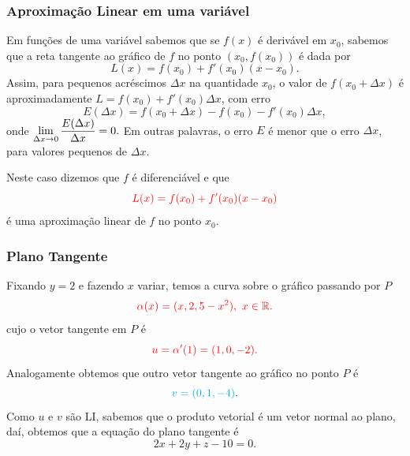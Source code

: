 \begin{frame}[label=der-parciais]
	\frametitle{Aproximação Linear em uma variável}
Em funções de uma variável sabemos que se {\color{blue}$f(x)$ é derivável em $x_0$}, sabemos que a reta tangente ao gráfico de $f$ no ponto $(x_0,f(x_0))$ é dada por
			\[L(x)=f(x_0)+f'(x_0)(x-x_0).\]
			Assim, para pequenos acréscimos $\Delta x$ na quantidade $x_0$, o valor de $f(x_0+\Delta x)$ é aproximadamente $L=f(x_0)+f'(x_0)\Delta x$, com erro
			\[E(\Delta x)=f(x_0+\Delta x)-f(x_0)-f'(x_0)\Delta x,\]
			onde {\color{red}$\displaystyle\lim_{\Delta x\to 0}\frac{E(\Delta x)}{\Delta x}=0.$} Em outras palavras, o erro $E$ é menor que o erro $\Delta x$, para valores pequenos de $\Delta x$.
			
			
			Neste caso dizemos que $f$ é {\color{blue} diferenciável} e  que 
\[{\color{red}L(x)=f(x_0)+f'(x_0)(x-x_0)}\]
é uma {\color{red} aproximação linear} de $f$ no ponto $x_0$.
		
		
\end{frame}


\begin{frame}[label=der-parciais]
	\frametitle{Plano Tangente }
		
		\bigskip 
		
Fixando  $y=2$ e fazendo $x$ variar, temos a curva sobre o gráfico passando por $P$
\[{\color{red}\alpha(x)=(x,2,5-x^2),\ x\in \mathbb{R}.}\]
cujo  o vetor tangente em $P$ é
\[{\color{red}u=\alpha'(1)=(1,0,-2).}\] 
Analogamente obtemos que outro vetor tangente ao gráfico no ponto $P$ é
\[{\color{cyan}v=(0,1,-4)}.\] 
Como {\color{cyan}$u$} e {\color{red}$v$} são LI, sabemos que o produto vetorial é um vetor normal ao plano, daí, obtemos que a equação do plano tangente é 
			\[2x+2y+z-10=0.\]
	
		
\end{frame}


